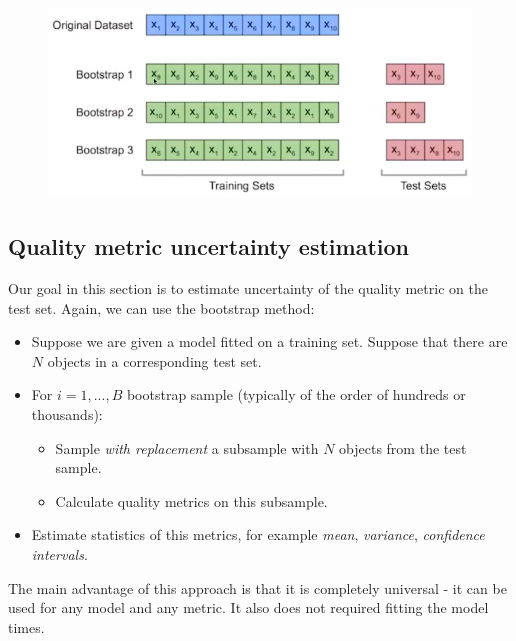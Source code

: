 \begin{figure}[H]
\centering
\includegraphics[scale=0.4]{outofbagbootstrap.png}
\end{figure}






\newpage

\subsection{Quality metric uncertainty estimation}
Our goal in this section is to estimate uncertainty of the quality metric on the test set. Again, we can use the bootstrap method:
\begin{itemize}
\item Suppose we are given a model fitted on a training set. Suppose that there are $N$ objects in a corresponding test set.
\item For $i=1,...,B$ bootstrap sample (typically of the order of hundreds or thousands):
\begin{itemize}
\item Sample \textit{with replacement} a subsample with $N$ objects from the test sample.
\item Calculate quality metrics on this subsample.
\end{itemize}
\item Estimate statistics of this metrics, for example \textit{mean}, \textit{variance}, \textit{confidence intervals}.
\end{itemize}
The main advantage of this approach is that it is completely universal - it can be used for any model and any metric. It also does not required fitting the model times.

